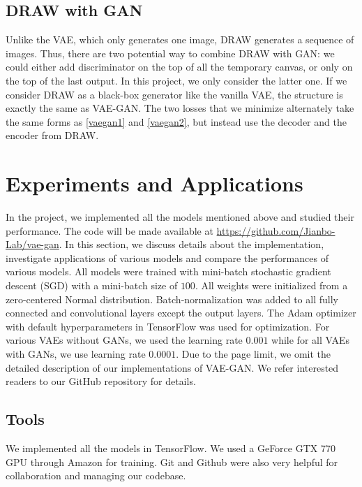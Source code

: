 \documentclass[10pt]{article}
\begin{document}
\subsection{DRAW with GAN}
Unlike the VAE, which only generates one image, DRAW generates a sequence of images.
Thus, there are two potential way to combine DRAW with GAN: we could either add discriminator on the top of all the temporary canvas, or only on the top of the last output.
In this project, we only consider the latter one.
If we consider DRAW as a black-box generator like the vanilla VAE, the structure is exactly the same as VAE-GAN.
The two losses that we minimize alternately take the same forms as \eqref{vaegan1} and \eqref{vaegan2}, but instead use the decoder and the encoder from DRAW.

\section{Experiments and Applications}
In the project, we implemented all the models mentioned above and studied their performance.
The code will be made available at \href{url}{https://github.com/Jianbo-Lab/vae-gan}.
In this section, we discuss details about the implementation, investigate applications of various models and compare the performances of various models.
All models were trained with mini-batch stochastic gradient descent (SGD) with a mini-batch size of $100$. All weights were initialized from a zero-centered Normal distribution. Batch-normalization \cite{sergey2015batchnorm} was added to all fully connected and convolutional layers except the output layers.
The Adam \cite{kingma2014adam} optimizer with default hyperparameters in TensorFlow was used for optimization. For various VAEs without GANs, we used the learning rate $0.001$ while for all VAEs with GANs, we use learning rate $0.0001$.
Due to the page limit, we omit the detailed description of our implementations of VAE-GAN. We refer interested readers to our GitHub repository for details.
\subsection{Tools}
We implemented all the models in TensorFlow. We used a GeForce GTX 770 GPU through Amazon for training. Git and Github were also very helpful for collaboration and managing our codebase.
\end{document}
